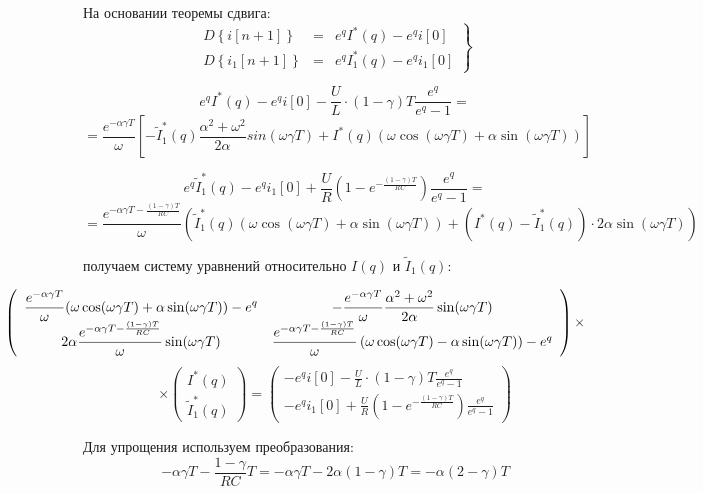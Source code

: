 \documentclass[a4paper,12pt]{article}
\begin{document}
На основании теоремы сдвига:
$$
\left.
\begin{array}{lcl}
D\left\{i[n+1]\right\} &=& e^q I^*(q) - e^q i[0]\\[1.5mm]
D\left\{i_1[n+1]\right\} &=& e^q I_1^*(q) - e^q i_1[0]
\end{array}
\right\}
$$

$$
e^q I^*(q) - e^qi[0] - \frac{U}{L}\cdot(1-\gamma)T\frac{e^q}{e^q - 1} = 
$$
$$
= \frac{e^{-\alpha\gamma T}}{\omega} \left[
-\tilde{I}_1^*(q) \frac{\alpha^2+\omega^2}{2\alpha} sin(\omega\gamma T) 
+ I^*(q) \left(\omega\cos(\omega\gamma T) + \alpha\sin(\omega\gamma T)\right)
\right]
$$

$$
e^q\tilde{I}^*_1(q) - e^q i_1[0] + 
\frac{U}{R}\left(1- e^{-\frac{(1-\gamma)T}{RC}} \right) \frac{e^q}{e^q-1} =
$$
$$
= \frac{e^{-\alpha\gamma T - \frac{(1-\gamma)T}{RC}}}{\omega} \left(
\tilde{I}_1^*(q) \left(\omega\cos(\omega\gamma T) + \alpha\sin(\omega\gamma T)\right)
+ \left(I^*(q) - \tilde{I}^*_1(q) \right)\cdot 2\alpha\sin(\omega\gamma T)
\right)
$$

получаем систему уравнений относительно $I(q)$ и $\tilde{I}_1(q)$:

$$
\hspace{-2cm}
\left(
\begin{array}{cc}
{\displaystyle \frac{e^{-\alpha\gamma T}}{\omega}(\omega\cos(\omega\gamma T) + \alpha\sin(\omega\gamma T)) - e^q} 
&
{\displaystyle -\frac{e^{-\alpha\gamma T}}{\omega}\frac{\alpha^2+\omega^2}{2\alpha}\sin(\omega\gamma T)}\\
	{\displaystyle 2\alpha\frac{e^{-\alpha\gamma T - \frac{(1-\gamma)T}{RC}}}{\omega}\sin(\omega\gamma T)}
&
	{\displaystyle \frac{e^{-\alpha\gamma T - \frac{(1-\gamma)T}{RC}}}{\omega}
	\left( \omega\cos(\omega\gamma T) - \alpha \sin(\omega\gamma T)\right)} - e^q
\end{array}
\right)\times
$$
$$
\times\left(
\begin{array}{c}
I^*(q)\\
\tilde{I}_1^*(q)
\end{array}
\right)=
\left(
\begin{array}{c}
	{\displaystyle - e^qi[0] - \frac{U}{L}\cdot(1-\gamma)T
	\frac{e^q}{e^q - 1}} \\[2.2mm]
{\displaystyle - e^q i_1[0] +
	\frac{U}{R}\left(1- e^{-\frac{(1-\gamma)T}{RC}} \right) \frac{e^q}{e^q-1}}
\end{array}
\right)
$$

Для упрощения используем преобразования:
$$
-\alpha\gamma T - \frac{1-\gamma}{RC}T = -\alpha\gamma T - 2\alpha(1-\gamma)T = - \alpha(2-\gamma)T
$$
\end{document}
